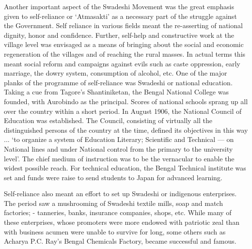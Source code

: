 Another important aspect of the Swadeshi Movement was the great emphasis given to self-reliance or `Atmasakti' as a necessary part of the struggle against the Government. Self reliance in various fields meant the re-asserting of national dignity, honor and confidence. Further, self-help and constructive work at the village level was envisaged as a means of bringing about the social and economic regeneration of the villages and of reaching the rural masses. In actual terms this meant social reform and campaigns against evils such as caste oppression, early marriage, the dowry system, consumption of alcohol, etc. One of the major planks of the programme of self-reliance was Swadeshi or national education. Taking a cue from Tagore's Shantiniketan, the Bengal National College was founded, with Aurobindo as the principal. Scores of national schools sprang up all over the country within a short period. In August 1906, the National Council of Education was established. The Council, consisting of virtually all the distinguished persons of the country at the time, defined its objectives in this way ... `to organize a system of Education Literary; Scientific and Technical --- on National lines and under National control from the primary to the university level'. The chief medium of instruction was to be the vernacular to enable the widest possible reach. For technical education, the Bengal Technical institute was set and funds were raise to send students to Japan for advanced learning.

Self-reliance also meant an effort to set up Swadeshi or indigenous enterprises. The period saw a mushrooming of Swadeshi textile mills, soap and match factories; - tanneries, banks, insurance companies, shops, etc. While many of these enterprises, whose promoters were more endowed with patriotic zeal than with business acumen were unable to survive for long, some others such as Acharya P.C. Ray's Bengal Chemicals Factory, became successful and famous.

